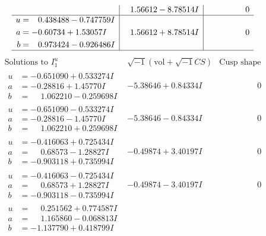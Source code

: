 \documentclass[1p]{elsarticle_modified}
\theoremstyle{definition}
\newcommand{\I}{\sqrt{-1}}
\begin{document}
$$\begin{array}{c|c|c}
 & \phantom{-}1.56612 - 8.78514 I & \phantom{-0.000000 } 0 \\ \hline\begin{aligned}
u &= \phantom{-}0.438488 - 0.747759 I \\
a &= -0.60734 + 1.53057 I \\
b &= \phantom{-}0.973424 - 0.926486 I\end{aligned}
 & \phantom{-}1.56612 + 8.78514 I & \phantom{-0.000000 } 0\\
 \hline 
 \end{array}$$\newpage$$\begin{array}{c|c|c}  
\text{Solutions to }I^u_{1}& \I (\text{vol} + \sqrt{-1}CS) & \text{Cusp shape}\\
 \hline 
\begin{aligned}
u &= -0.651090 + 0.533274 I \\
a &= -0.28816 + 1.45770 I \\
b &= \phantom{-}1.062210 - 0.259698 I\end{aligned}
 & -5.38646 + 0.84334 I & \phantom{-0.000000 } 0 \\ \hline\begin{aligned}
u &= -0.651090 - 0.533274 I \\
a &= -0.28816 - 1.45770 I \\
b &= \phantom{-}1.062210 + 0.259698 I\end{aligned}
 & -5.38646 - 0.84334 I & \phantom{-0.000000 } 0 \\ \hline\begin{aligned}
u &= -0.416063 + 0.725434 I \\
a &= \phantom{-}0.68573 - 1.28827 I \\
b &= -0.903118 + 0.735994 I\end{aligned}
 & -0.49874 + 3.40197 I & \phantom{-0.000000 } 0 \\ \hline\begin{aligned}
u &= -0.416063 - 0.725434 I \\
a &= \phantom{-}0.68573 + 1.28827 I \\
b &= -0.903118 - 0.735994 I\end{aligned}
 & -0.49874 - 3.40197 I & \phantom{-0.000000 } 0 \\ \hline\begin{aligned}
u &= \phantom{-}0.251562 + 0.774587 I \\
a &= \phantom{-}1.165860 - 0.068813 I \\
b &= -1.137790 + 0.418799 I\end{aligned}

\end{array}$$
\end{document}
